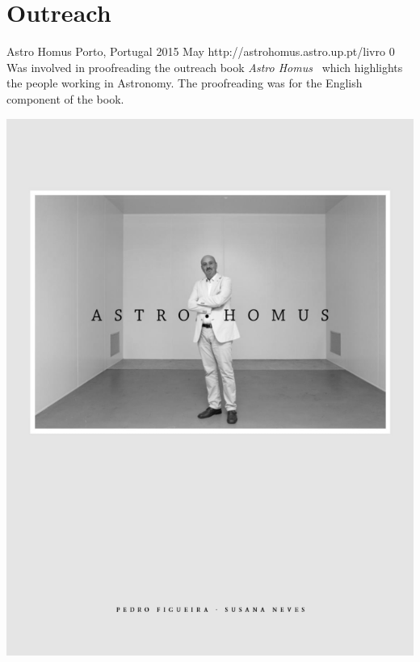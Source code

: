 \section{Outreach}\label{appsec:outreach}

{Astro Homus}%
{Porto, Portugal}%
{2015 May}%
{http://astrohomus.astro.up.pt/livro}%
{0}%
{Was involved in proofreading the outreach book \emph{Astro Homus}~\citep{figueira_astro_2015} which highlights the people working in Astronomy.
    The proofreading was for the English component of the book.\\} %


\begin{center}
        \includegraphics[width=0.65\linewidth]{figures/appendix/astrohomus_grey}
\end{center}
